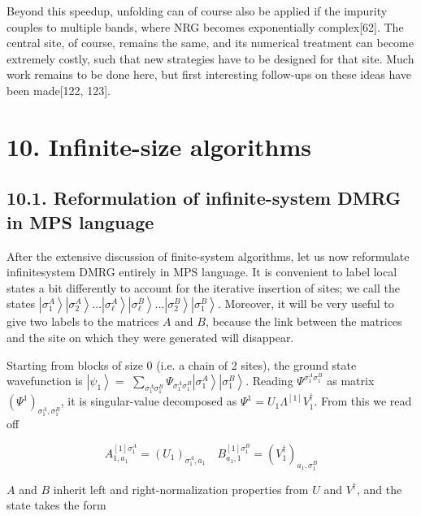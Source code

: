 \documentclass[12pt]{article}
\begin{document}
Beyond this speedup, unfolding can of course also be applied if the impurity couples to multiple bands, where NRG becomes exponentially complex[62]. The central site, of course, remains the same, and its numerical treatment can become extremely costly, such that new strategies have to be designed for that site. Much work remains to be done here, but first interesting follow-ups on these ideas have been made[122, 123].

\section*{10. Infinite-size algorithms}
\subsection*{10.1. Reformulation of infinite-system DMRG in MPS language}
After the extensive discussion of finite-system algorithms, let us now reformulate infinitesystem DMRG entirely in MPS language. It is convenient to label local states a bit differently to account for the iterative insertion of sites; we call the states $\left|\sigma_{1}^{A}\right\rangle\left|\sigma_{2}^{A}\right\rangle \ldots\left|\sigma_{\ell}^{A}\right\rangle\left|\sigma_{\ell}^{B}\right\rangle \ldots\left|\sigma_{2}^{B}\right\rangle\left|\sigma_{1}^{B}\right\rangle$. Moreover, it will be very useful to give two labels to the matrices $A$ and $B$, because the link between the matrices and the site on which they were generated will disappear.

Starting from blocks of size 0 (i.e. a chain of 2 sites), the ground state wavefunction is $\left|\psi_{1}\right\rangle=$ $\sum_{\sigma_{1}^{A} \sigma_{1}^{B}} \Psi_{\sigma_{1}^{A} \sigma_{1}^{B}}\left|\sigma_{1}^{A}\right\rangle\left|\sigma_{1}^{B}\right\rangle$. Reading $\Psi^{\sigma_{1}^{A} \sigma_{1}^{B}}$ as matrix $\left(\Psi^{1}\right)_{\sigma_{1}^{A}, \sigma_{1}^{B}}$, it is singular-value decomposed as $\Psi^{1}=U_{1} \Lambda^{[1]} V_{1}^{\dagger}$. From this we read off


\begin{equation*}
A_{1, a_{1}}^{[1] \sigma_{1}^{A}}=\left(U_{1}\right)_{\sigma_{1}^{A}, a_{1}} \quad B_{a_{1}, 1}^{[1] \sigma_{1}^{B}}=\left(V_{1}^{\dagger}\right)_{a_{1}, \sigma_{1}^{B}} \tag{322}
\end{equation*}


$A$ and $B$ inherit left and right-normalization properties from $U$ and $V^{\dagger}$, and the state takes the form
\end{document}
